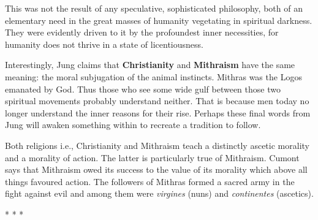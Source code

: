 \begin{quotex}
This was not the result of any speculative, sophisticated philosophy, both of an elementary need in the great masses of humanity vegetating in spiritual darkness. They were evidently driven to it by the profoundest inner necessities, for humanity does not thrive in a state of licentiousness.
\end{quotex}


Interestingly, Jung claims that \textbf{Christianity} and \textbf{Mithraism} have the same meaning: the moral subjugation of the animal instincts. Mithras was the Logos emanated by God. Thus those who see some wide gulf between those two spiritual movements probably understand neither. That is because men today no longer understand the inner reasons for their rise. Perhaps these final words from Jung will awaken something within to recreate a tradition to follow.

\begin{quotex}
Both religions i.e., Christianity and Mithraism teach a distinctly ascetic morality and a morality of action. The latter is particularly true of Mithraism. Cumont says that Mithraism owed its success to the value of its morality which above all things favoured action. The followers of Mithras formed a sacred army in the fight against evil and among them were \emph{virgines} (nuns) and \emph{continentes} (ascetics).
\end{quotex}




\begin{center}* * *\end{center}

